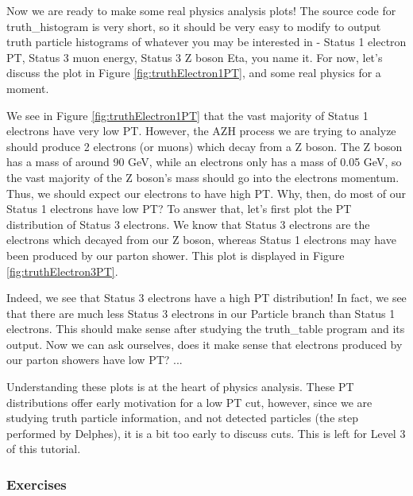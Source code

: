 \documentclass{article}
\begin{document}
\bigskip

Now we are ready to make some real physics analysis plots! The source code for truth\_histogram
is very short, so it should be very easy to modify to output truth particle histograms of whatever
you may be interested in - Status 1 electron PT, Status 3 muon energy, Status 3 Z boson Eta, you
name it. For now, let's discuss the plot in Figure \ref{fig:truthElectron1PT}, and some real physics for a moment.

\bigskip

We see in Figure \ref{fig:truthElectron1PT} that the vast majority of Status 1 electrons have
very low PT. However, the AZH process we are trying to analyze should produce 2 electrons (or muons)
which decay from a Z boson. The Z boson has a mass of around 90 GeV, while an electrons only has a
mass of 0.05 GeV, so the vast majority of the Z boson's mass should go into the electrons momentum.
Thus, we should expect our electrons to have high PT. Why, then, do most of our Status 1 electrons
have low PT? To answer that, let's first plot the PT distribution of Status 3 electrons. We know
that Status 3 electrons are the electrons which decayed from our Z boson, whereas Status 1 electrons
may have been produced by our parton shower. This plot is displayed in Figure \ref{fig:truthElectron3PT}.

\bigskip

Indeed, we see that Status 3 electrons have a high PT distribution! In fact, we see that there are
much less Status 3 electrons in our Particle branch than Status 1 electrons. This should make sense
after studying the truth\_table program and its output. Now we can ask ourselves, does it make sense
that electrons produced by our parton showers have low PT? ...

\bigskip

Understanding these plots is at the heart of physics analysis. These PT distributions offer early
motivation for a low PT cut, however, since we are studying truth particle information, and not
detected particles (the step performed by Delphes), it is a bit too early to discuss cuts. This
is left for Level 3 of this tutorial.

\subsubsection*{Exercises}
\end{document}
